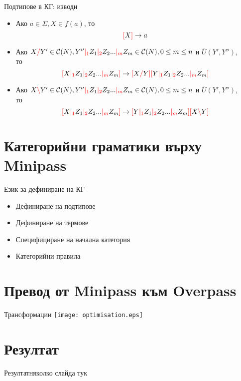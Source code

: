 \documentclass[9pt]{beamer}
\begin{document}
  \begin{frame}{Подтипове в КГ: изводи}
    \begin{itemize}
        \item Ако $ a \in \Sigma, X \in f(a) $, то \[ \textcolor{red}{[} X \textcolor{red}{]} \rightarrow a \]
        \item Ако $ X \textcolor{red}{/} Y' \in \mathcal{C}( N ), Y'' \textcolor{red}{|_{1}} Z_1 \textcolor{red}{|_{2}} Z_2 ... \textcolor{red}{|_{m}} Z_m \in \mathcal{C}( N ), 0 \leq m \leq n $
            и $\overline{U}(Y', Y'')$, \\
            то \[ \textcolor{red}{[} X \textcolor{red}{|_{1}} Z_1 \textcolor{red}{|_{2}} Z_2 ... \textcolor{red}{|_{m}} Z_m \textcolor{red}{]} \rightarrow \textcolor{red}{[} X \textcolor{red}{/} Y \textcolor{red}{]} \textcolor{red}{[} Y \textcolor{red}{|_{1}} Z_1 \textcolor{red}{|_{2}} Z_2 ... \textcolor{red}{|_{m}} Z_m \textcolor{red}{]} \]
        \item Ако $ X \textcolor{red}{\backslash} Y' \in \mathcal{C}( N ), Y'' \textcolor{red}{|_{1}} Z_1 \textcolor{red}{|_{2}} Z_2 ... \textcolor{red}{|_{m}} Z_m \in \mathcal{C}( N ), 0 \leq m \leq n $
            и $\overline{U}(Y', Y'')$, \\
            то \[ \textcolor{red}{[} X \textcolor{red}{|_{1}} Z_1 \textcolor{red}{|_{2}} Z_2 ... \textcolor{red}{|_{m}} Z_m \textcolor{red}{]} \rightarrow \textcolor{red}{[} Y \textcolor{red}{|_{1}} Z_1 \textcolor{red}{|_{2}} Z_2 ... \textcolor{red}{|_{m}} Z_m \textcolor{red}{]} \textcolor{red}{[} X \textcolor{red}{\backslash} Y \textcolor{red}{]} \]
    \end{itemize}
  \end{frame}

  \section{Категорийни граматики върху Minipass}
  \begin{frame}{Език за дефиниране на КГ}
    \begin{itemize}
      \item Дефиниране на подтипове
      \item Дефиниране на термове
      \item Специфициране на начална категория
      \item Категорийни правила
    \end{itemize}
  \end{frame}

  \section{Превод от Minipass към Overpass}
  \begin{frame}{Трансформации}
    \texttt{[image: optimisation.eps]}
  \end{frame}

  \section{Резултат}
  \begin{frame}{Резултат}няколко слайда тук\end{frame}
\end{document}
